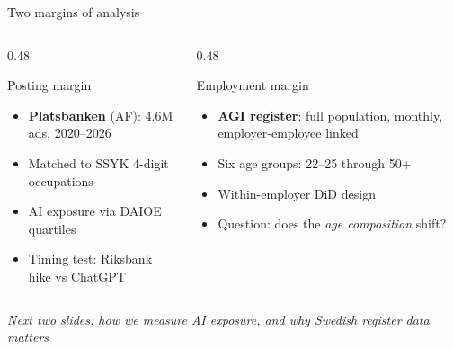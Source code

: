 \documentclass[aspectratio=169,11pt]{beamer}
\begin{document}
\begin{frame}{Two margins of analysis}
\begin{columns}[T]
\begin{column}{0.48\textwidth}
\begin{block}{Posting margin}
\begin{itemize}
    \item \textbf{Platsbanken} (AF): 4.6M ads, 2020--2026
    \item Matched to SSYK 4-digit occupations
    \item AI exposure via DAIOE quartiles
    \item Timing test: Riksbank hike vs ChatGPT
\end{itemize}
\end{block}
\end{column}
\begin{column}{0.48\textwidth}
\begin{block}{Employment margin}
\begin{itemize}
    \item \textbf{AGI register}: full population, monthly, employer-employee linked
    \item Six age groups: 22--25 through 50+
    \item Within-employer DiD design
    \item Question: does the \textit{age composition} shift?
\end{itemize}
\end{block}
\end{column}
\end{columns}
\vspace{5mm}
\begin{center}
\textit{Next two slides: how we measure AI exposure, and why Swedish register data matters}
\end{center}
\end{frame}
\end{document}
